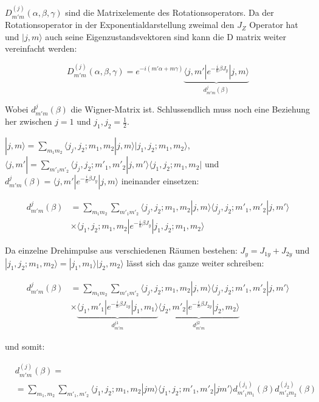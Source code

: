 \(D^{(j)}_{m'm}(\alpha, \beta,\gamma)\) sind die Matrixelemente des Rotationsoperators. Da der Rotationsoperator in der Exponentialdarstellung zweimal den \(J_Z\) Operator hat und \(|j,m\rangle \) auch seine Eigenzustandsvektoren sind kann die D matrix weiter vereinfacht werden:


\[\boxed{D^{(j)}_{m'm}(\alpha, \beta,\gamma) = e^{-i(m'\alpha+m\gamma)}\underbrace{\langle j,m'|e^{-\frac{i}{\hbar}\beta J_y}|j,m\rangle}_{d_{m'm}^{j}(\beta)}}\]
 

Wobei \(d_{m'm}^{j}(\beta)\)  die Wigner-Matrix ist. Schlussendlich muss noch eine Beziehung her zwischen \(j=1\) und \(j_1,j_2=\frac{1}{2}\). 

\(|j,m\rangle = \sum_{m_1m_2}\langle j_j,j_2;m_1,m_2|j,m\rangle |j_1,j_2;m_1,m_2\rangle \), \(\langle  j,m'| = \sum_{m'_1m'_2}\langle j_j,j_2;m'_1,m'_2|j,m'\rangle \langle j_1,j_2;m_1,m_2| \) und \(d_{m'm}^{j}(\beta)=\langle j,m'|e^{-\frac{i}{\hbar}\beta J_y}|j,m\rangle\) ineinander einsetzen:

\begin{align}
d_{m'm}^{j}(\beta)&=  \sum_{m_1m_2} \sum_{m'_1m'_2}\langle j_j,j_2;m_1,m_2|j,m\rangle\langle j_j,j_2;m'_1,m'_2|j,m'\rangle \\
 &\times \langle j_1,j_2;m_1,m_2|e^{-\frac{i}{\hbar}\beta J_y} |j_1,j_2;m_1,m_2\rangle
\end{align}

 
Da einzelne Drehimpulse aus verschiedenen Räumen bestehen: \(J_y = J_{1y}+J_{2y}\) und \(|j_1,j_2;m_1,m_2\rangle = |j_1,m_1\rangle |j_2,m_2\rangle\) lässt sich das ganze weiter schreiben:


\begin{align}
d_{m'm}^{j}(\beta)&=  \sum_{m_1m_2} \sum_{m'_1m'_2}\langle j_j,j_2;m_1,m_2|j,m\rangle\langle j_j,j_2;m'_1,m'_2|j,m'\rangle \\
 &\times\underbrace{ \langle j_1,m'_1|e^{-\frac{i}{\hbar}\beta J_{1y}}|j_1,m_1\rangle}_{d_{m'm}^{j1}}\underbrace{\langle j_2,m'_2|e^{-\frac{i}{\hbar}\beta J_{2y}} |j_2,m_2\rangle}_{d_{m'm}^{j2}}
\end{align}


und somit:



\begin{align}
 &d_{m'm}^{(j)}(\beta)= \\
&= \sum_{m_1,m_2}\sum_{m'_1,m'_2} \langle j_1,j_2;m_1,m_2|jm\rangle \langle j_1,j_2;m'_1,m'_2|jm'\rangle d_{m'_1m_1}^{(j_1)}(\beta)d_{m'_2m_2}^{(j_2)}(\beta)
\end{align}



